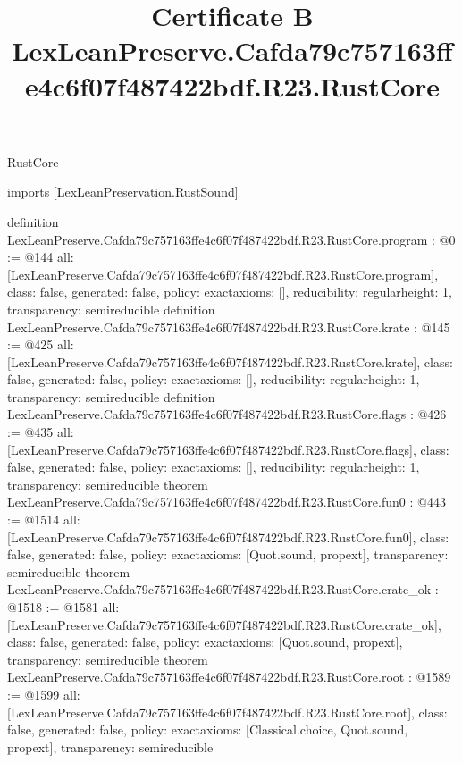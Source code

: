 \begin{lexlean}{RustCore}
\title{Certificate B LexLeanPreserve.Cafda79c757163ffe4c6f07f487422bdf.R23.RustCore}
\begin{coremodule}
imports [LexLeanPreservation.RustSound]

definition LexLeanPreserve.Cafda79c757163ffe4c6f07f487422bdf.R23.RustCore.program : @0 := @144 {
  all: [LexLeanPreserve.Cafda79c757163ffe4c6f07f487422bdf.R23.RustCore.program],
  class: false,
  generated: false,
  policy: exact{axioms: []},
  reducibility: regular{height: 1},
  transparency: semireducible
}
definition LexLeanPreserve.Cafda79c757163ffe4c6f07f487422bdf.R23.RustCore.krate : @145 := @425 {
  all: [LexLeanPreserve.Cafda79c757163ffe4c6f07f487422bdf.R23.RustCore.krate],
  class: false,
  generated: false,
  policy: exact{axioms: []},
  reducibility: regular{height: 1},
  transparency: semireducible
}
definition LexLeanPreserve.Cafda79c757163ffe4c6f07f487422bdf.R23.RustCore.flags : @426 := @435 {
  all: [LexLeanPreserve.Cafda79c757163ffe4c6f07f487422bdf.R23.RustCore.flags],
  class: false,
  generated: false,
  policy: exact{axioms: []},
  reducibility: regular{height: 1},
  transparency: semireducible
}
theorem LexLeanPreserve.Cafda79c757163ffe4c6f07f487422bdf.R23.RustCore.fun0 : @443 := @1514 {
  all: [LexLeanPreserve.Cafda79c757163ffe4c6f07f487422bdf.R23.RustCore.fun0],
  class: false,
  generated: false,
  policy: exact{axioms: [Quot.sound, propext]},
  transparency: semireducible
}
theorem LexLeanPreserve.Cafda79c757163ffe4c6f07f487422bdf.R23.RustCore.crate_ok : @1518 := @1581 {
  all: [LexLeanPreserve.Cafda79c757163ffe4c6f07f487422bdf.R23.RustCore.crate_ok],
  class: false,
  generated: false,
  policy: exact{axioms: [Quot.sound, propext]},
  transparency: semireducible
}
theorem LexLeanPreserve.Cafda79c757163ffe4c6f07f487422bdf.R23.RustCore.root : @1589 := @1599 {
  all: [LexLeanPreserve.Cafda79c757163ffe4c6f07f487422bdf.R23.RustCore.root],
  class: false,
  generated: false,
  policy: exact{axioms: [Classical.choice, Quot.sound, propext]},
  transparency: semireducible
}


\end{coremodule}
\end{lexlean}
